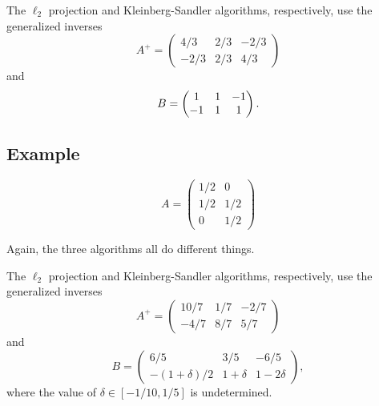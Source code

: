 \documentclass{article}
\begin{document}
The \(\ell_2\) projection and Kleinberg-Sandler algorithms, respectively, use the generalized inverses
\[
    A^+ =
    \begin{pmatrix}
         4/3 & 2/3 & -2/3
    \\  -2/3 & 2/3 &  4/3
    \end{pmatrix}
\]
    and
\[
    B =
    \begin{pmatrix}
         1 & 1 & -1
    \\  -1 & 1 &  1
    \end{pmatrix}
    \ldotp
\]

\subsection{Example}

\[
    A =
    \begin{pmatrix}
        1/2 & 0
    \\  1/2 & 1/2
    \\  0   & 1/2
    \end{pmatrix}
\]

Again, the three algorithms all do different things.

The \(\ell_2\) projection and Kleinberg-Sandler algorithms, respectively, use the generalized inverses
\[
    A^+ =
    \begin{pmatrix}
        10/7 & 1/7 & -2/7
    \\  -4/7 & 8/7 &  5/7
    \end{pmatrix}
\]
    and
\[
    B =
    \begin{pmatrix}
        6/5               & 3/5        & -6/5
    \\  -(1 + \delta) / 2 & 1 + \delta & 1 - 2 \delta
    \end{pmatrix}
    ,
\]
where the value of \(\delta \in [-1/10, 1/5]\) is undetermined.
\end{document}
